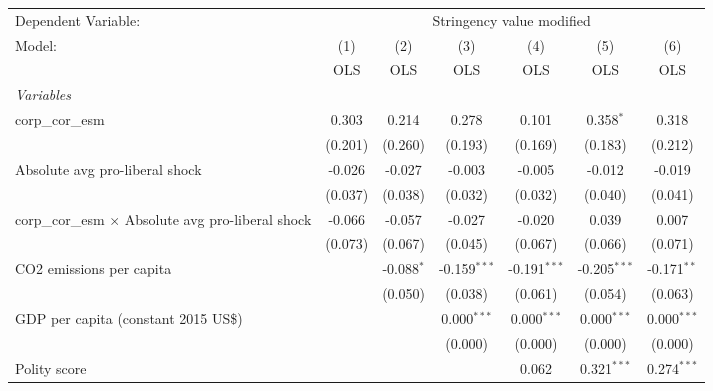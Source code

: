
\begingroup
\centering
\begin{tabular}{lcccccc}
   \toprule
   Dependent Variable: & \multicolumn{6}{c}{Stringency value modified}\\
   Model:                                                    & (1)     & (2)          & (3)            & (4)            & (5)            & (6)\\  
                                                             &  OLS    & OLS          & OLS            & OLS            & OLS            & OLS\\  
   \midrule
   \emph{Variables}\\
   corp\_cor\_esm                                            & 0.303   & 0.214        & 0.278          & 0.101          & 0.358$^{*}$    & 0.318\\   
                                                             & (0.201) & (0.260)      & (0.193)        & (0.169)        & (0.183)        & (0.212)\\   
   Absolute avg pro-liberal shock                            & -0.026  & -0.027       & -0.003         & -0.005         & -0.012         & -0.019\\   
                                                             & (0.037) & (0.038)      & (0.032)        & (0.032)        & (0.040)        & (0.041)\\   
   corp\_cor\_esm $\times$ Absolute avg pro-liberal shock    & -0.066  & -0.057       & -0.027         & -0.020         & 0.039          & 0.007\\   
                                                             & (0.073) & (0.067)      & (0.045)        & (0.067)        & (0.066)        & (0.071)\\   
   CO2 emissions per capita                                  &         & -0.088$^{*}$ & -0.159$^{***}$ & -0.191$^{***}$ & -0.205$^{***}$ & -0.171$^{**}$\\   
                                                             &         & (0.050)      & (0.038)        & (0.061)        & (0.054)        & (0.063)\\   
   GDP per capita (constant 2015 US\$)                       &         &              & 0.000$^{***}$  & 0.000$^{***}$  & 0.000$^{***}$  & 0.000$^{***}$\\   
                                                             &         &              & (0.000)        & (0.000)        & (0.000)        & (0.000)\\   
   Polity score                                              &         &              &                & 0.062          & 0.321$^{***}$  & 0.274$^{***}$\\   

\end{tabular}
